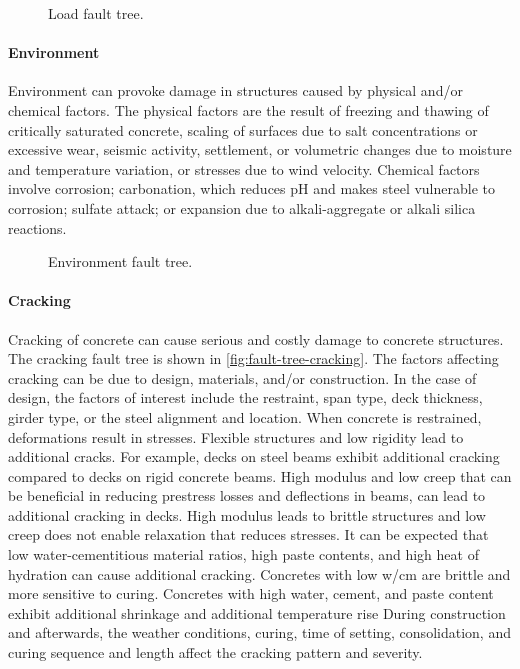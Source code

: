 \begin{figure}
  \caption{Load fault tree.}
  \label{fig:fault-tree-load} 
\end{figure}

\paragraph{Environment}
Environment can provoke damage in structures caused by physical and/or chemical factors. The physical factors
are the result of freezing and thawing of critically saturated concrete, scaling of surfaces due to salt concentrations or
excessive wear, seismic activity, settlement, or volumetric changes due to moisture and temperature variation, or
stresses due to wind velocity. Chemical factors involve corrosion; carbonation, which reduces pH and makes steel
vulnerable to corrosion; sulfate attack; or expansion due to alkali-aggregate or alkali silica reactions.

\begin{figure}
  \caption{Environment fault tree.}
  \label{fig:fault-tree-environment} 
\end{figure}

\paragraph{Cracking}
Cracking of concrete can cause serious and costly damage to concrete structures. The cracking fault tree is shown in \cref{fig:fault-tree-cracking}. The factors affecting cracking can be due to design, materials, and/or construction. In the case of design, the factors of interest include the restraint, span type, deck thickness, girder type, or the steel alignment and location. When concrete is restrained, deformations result in stresses. Flexible structures and low rigidity lead to additional cracks. For example, decks on steel beams exhibit additional cracking compared to decks on rigid concrete beams. High modulus and low creep that can be beneficial in reducing prestress losses and deflections in beams, can lead to additional cracking in decks. High modulus leads to brittle structures and low creep does not enable relaxation that reduces stresses. It can be expected that low water-cementitious material ratios, high paste contents, and high heat of hydration can cause additional cracking. Concretes with low w/cm are brittle and more sensitive to curing. Concretes with high water, cement, and paste content exhibit additional shrinkage and additional temperature rise During construction and afterwards, the weather conditions, curing, time of setting, consolidation, and curing sequence and length affect the cracking pattern and severity.

